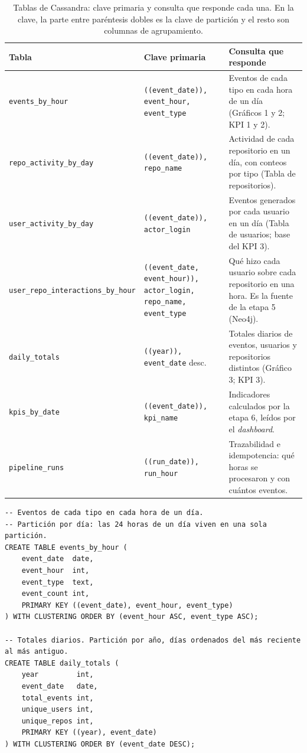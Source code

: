 \begin{table}[H]
\centering
\caption{Tablas de Cassandra: clave primaria y consulta que responde cada una. En la clave, la parte entre paréntesis dobles es la clave de partición y el resto son columnas de agrupamiento.}
\label{tab:tablas-cassandra}
\vspace{0.2cm}
\footnotesize
\begin{tabular}{@{}p{4.4cm}p{5.0cm}p{5.3cm}@{}}
\toprule
\textbf{Tabla} & \textbf{Clave primaria} & \textbf{Consulta que responde} \\
\midrule
\texttt{events\_by\_hour} &
\texttt{((event\_date)), event\_hour, event\_type} &
Eventos de cada tipo en cada hora de un día (Gráficos 1 y 2; KPI 1 y 2). \\
\addlinespace
\texttt{repo\_activity\_by\_day} &
\texttt{((event\_date)), repo\_name} &
Actividad de cada repositorio en un día, con conteos por tipo (Tabla de repositorios). \\
\addlinespace
\texttt{user\_activity\_by\_day} &
\texttt{((event\_date)), actor\_login} &
Eventos generados por cada usuario en un día (Tabla de usuarios; base del KPI 3). \\
\addlinespace
\texttt{user\_repo\_\bk{}interactions\_\bk{}by\_hour} &
\texttt{((event\_date, event\_hour)), actor\_login, repo\_name, event\_type} &
Qué hizo cada usuario sobre cada repositorio en una hora. Es la fuente de la etapa 5 (Neo4j). \\
\addlinespace
\texttt{daily\_totals} &
\texttt{((year)), event\_date} desc. &
Totales diarios de eventos, usuarios y repositorios distintos (Gráfico 3; KPI 3). \\
\addlinespace
\texttt{kpis\_by\_date} &
\texttt{((event\_date)), kpi\_name} &
Indicadores calculados por la etapa 6, leídos por el \textit{dashboard}. \\
\addlinespace
\texttt{pipeline\_runs} &
\texttt{((run\_date)), run\_hour} &
Trazabilidad e idempotencia: qué horas se procesaron y con cuántos eventos. \\
\bottomrule
\end{tabular}
\end{table}

\begin{lstlisting}[style=cql]
-- Eventos de cada tipo en cada hora de un día.
-- Partición por día: las 24 horas de un día viven en una sola partición.
CREATE TABLE events_by_hour (
    event_date  date,
    event_hour  int,
    event_type  text,
    event_count int,
    PRIMARY KEY ((event_date), event_hour, event_type)
) WITH CLUSTERING ORDER BY (event_hour ASC, event_type ASC);

-- Totales diarios. Partición por año, días ordenados del más reciente al más antiguo.
CREATE TABLE daily_totals (
    year         int,
    event_date   date,
    total_events int,
    unique_users int,
    unique_repos int,
    PRIMARY KEY ((year), event_date)
) WITH CLUSTERING ORDER BY (event_date DESC);
\end{lstlisting}


